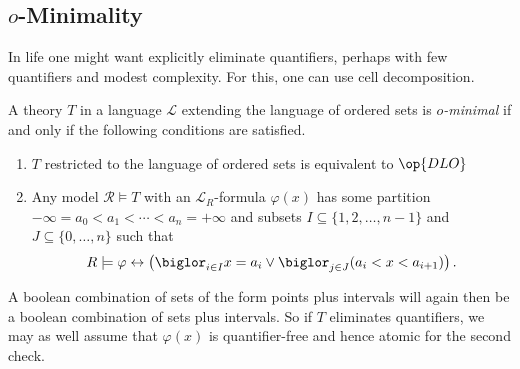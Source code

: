 \documentclass[../notes.tex]{subfiles}
\begin{document}
\subsection{\texorpdfstring{$o$}{ o}-Minimality}
In life one might want explicitly eliminate quantifiers, perhaps with few quantifiers and modest complexity. For this, one can use cell decomposition.
\begin{defihelper}[$o$-minimal] 
	A theory $T$ in a language $\mathcal L$ extending the language of ordered sets is \textit{$o$-minimal} if and only if the following conditions are satisfied.
	\begin{enumerate}
		\item $T$ restricted to the language of ordered sets is equivalent to $\op{DLO}$
		\item Any model $\mathcal R\models T$ with an $\mathcal L_R$-formula $\varphi(x)$ has some partition $-\infty=a_0<a_1<\cdots<a_n=+\infty$ and subsets $I\subseteq\{1,2,\ldots,n-1\}$ and $J\subseteq\{0,\ldots,n\}$ such that
		\[R\models\varphi\leftrightarrow\left(\biglor_{i\in I}x=a_i\lor\biglor_{j\in J}(a_i<x<a_{i+1})\right).\]
	\end{enumerate}
\end{defihelper}
\begin{remark}
	A boolean combination of sets of the form points plus intervals will again then be a boolean combination of sets plus intervals. So if $T$ eliminates quantifiers, we may as well assume that $\varphi(x)$ is quantifier-free and hence atomic for the second check.
\end{remark}
\end{document}

